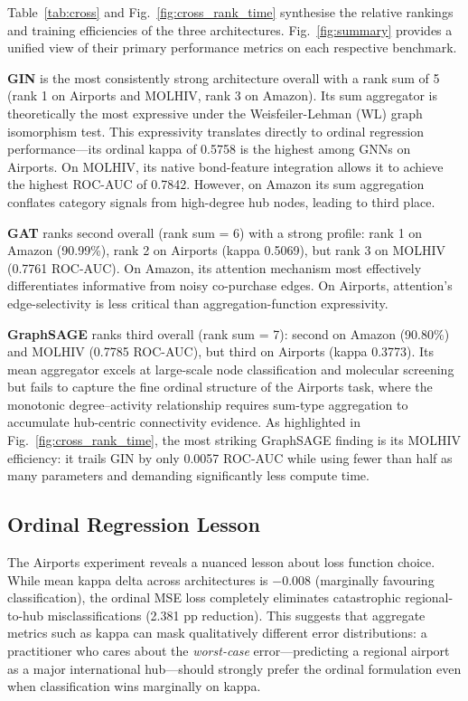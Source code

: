\documentclass[conference]{IEEEtran}
\begin{document}
Table~\ref{tab:cross} and Fig.~\ref{fig:cross_rank_time} synthesise the relative rankings and training efficiencies of the three architectures. Fig.~\ref{fig:summary} provides a unified view of their primary performance metrics on each respective benchmark.

\textbf{GIN} is the most consistently strong architecture overall with a rank sum of 5 (rank 1 on Airports and MOLHIV, rank 3 on Amazon). Its sum aggregator is theoretically the most expressive under the Weisfeiler-Lehman (WL) graph isomorphism test. This expressivity translates directly to ordinal regression performance---its ordinal kappa of 0.5758 is the highest among GNNs on Airports. On MOLHIV, its native bond-feature integration allows it to achieve the highest ROC-AUC of 0.7842. However, on Amazon its sum aggregation conflates category signals from high-degree hub nodes, leading to third place.

\textbf{GAT} ranks second overall (rank sum = 6) with a strong profile: rank 1 on Amazon (90.99\%), rank 2 on Airports (kappa 0.5069), but rank 3 on MOLHIV (0.7761 ROC-AUC). On Amazon, its attention mechanism most effectively differentiates informative from noisy co-purchase edges. On Airports, attention's edge-selectivity is less critical than aggregation-function expressivity.

\textbf{GraphSAGE} ranks third overall (rank sum = 7): second on Amazon (90.80\%) and MOLHIV (0.7785 ROC-AUC), but third on Airports (kappa 0.3773). Its mean aggregator excels at large-scale node classification and molecular screening but fails to capture the fine ordinal structure of the Airports task, where the monotonic degree--activity relationship requires sum-type aggregation to accumulate hub-centric connectivity evidence. As highlighted in Fig.~\ref{fig:cross_rank_time}, the most striking GraphSAGE finding is its MOLHIV efficiency: it trails GIN by only 0.0057 ROC-AUC while using fewer than half as many parameters and demanding significantly less compute time.

\subsection{Ordinal Regression Lesson}

The Airports experiment reveals a nuanced lesson about loss function choice. While mean kappa delta across architectures is $-0.008$ (marginally favouring classification), the ordinal MSE loss completely eliminates catastrophic regional-to-hub misclassifications (2.381 pp reduction). This suggests that aggregate metrics such as kappa can mask qualitatively different error distributions: a practitioner who cares about the \emph{worst-case} error---predicting a regional airport as a major international hub---should strongly prefer the ordinal formulation even when classification wins marginally on kappa.
\end{document}
